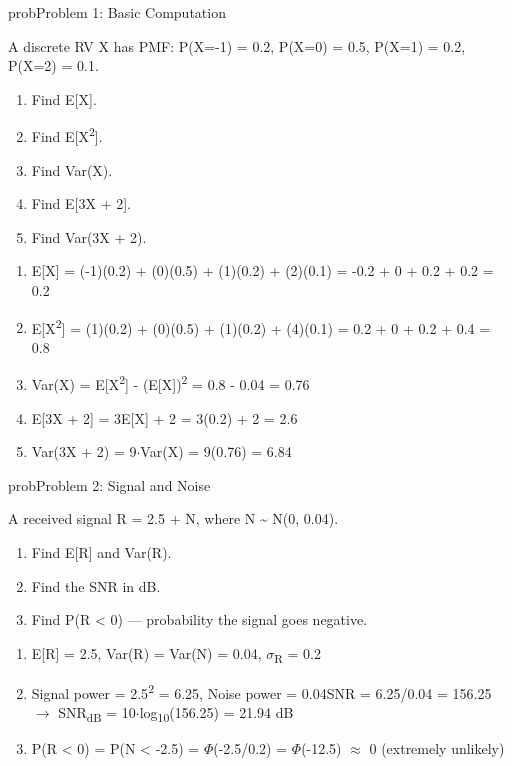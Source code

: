\begin{PSbox}[unbreakable]{prob}{Problem 1: Basic Computation}

A discrete RV X has PMF: P(X=-1) = 0.2, P(X=0) = 0.5, P(X=1) = 0.2, P(X=2) = 0.1.

\begin{enumerate}
\def\labelenumi{(\alph{enumi})}
\tightlist
\item
  Find E[X].
\item
  Find E[X\textsuperscript{2}].
\item
  Find Var(X).
\item
  Find E[3X + 2].
\item
  Find Var(3X + 2).
\end{enumerate}

\PSsolution{} 

\begin{enumerate}
\def\labelenumi{(\alph{enumi})}
\item
  E[X] = (-1)(0.2) + (0)(0.5) + (1)(0.2) + (2)(0.1) = -0.2 + 0 + 0.2 + 0.2 = 0.2
\item
  E[X\textsuperscript{2}] = (1)(0.2) + (0)(0.5) + (1)(0.2) + (4)(0.1) = 0.2 + 0 + 0.2 + 0.4 = 0.8
\item
  Var(X) = E[X\textsuperscript{2}] - (E[X])\textsuperscript{2} = 0.8 - 0.04 = 0.76
\item
  E[3X + 2] = 3E[X] + 2 = 3(0.2) + 2 = 2.6
\item
  Var(3X + 2) = 9\ensuremath{\cdot}Var(X) = 9(0.76) = 6.84
\end{enumerate}

\end{PSbox}

\begin{PSbox}[unbreakable]{prob}{Problem 2: Signal and Noise}

A received signal R = 2.5 + N, where N \textasciitilde{} N(0, 0.04).

\begin{enumerate}
\def\labelenumi{(\alph{enumi})}
\tightlist
\item
  Find E[R] and Var(R).
\item
  Find the SNR in dB.
\item
  Find P(R \textless{} 0) — probability the signal goes negative.
\end{enumerate}

\PSsolution{} 

\begin{enumerate}
\def\labelenumi{(\alph{enumi})}
\item
  E[R] = 2.5, Var(R) = Var(N) = 0.04, \ensuremath{\sigma}\textsubscript{R} = 0.2
\item
  Signal power = 2.5\textsuperscript{2} = 6.25, Noise power = 0.04\PSbr{}SNR = 6.25/0.04 = 156.25 \ensuremath{\to} SNR\textsubscript{dB} = 10\ensuremath{\cdot}log\textsubscript{10}(156.25) = 21.94 dB
\item
  P(R \textless{} 0) = P(N \textless{} -2.5) = \ensuremath{\Phi}(-2.5/0.2) = \ensuremath{\Phi}(-12.5) \ensuremath{\approx} 0 (extremely unlikely)
\end{enumerate}

\end{PSbox}

